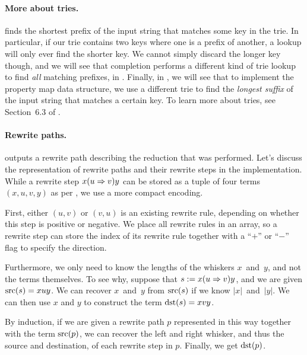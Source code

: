 \documentclass[../generics]{subfiles}
\begin{document}
\paragraph{More about tries.}  finds the shortest prefix of the input string that matches some key in the trie. In particular, if our trie contains two keys where one is a prefix of another, a lookup will only ever find the shorter key. We cannot simply discard the longer key though, and we will see that completion performs a different kind of trie lookup to find \emph{all} matching prefixes, in . Finally, in , we will see that to implement the property map data structure, we use a different trie to find the \emph{longest suffix} of the input string that matches a certain key. To learn more about tries, see Section~6.3 of \cite{art3}.

\paragraph{Rewrite paths.}
 outputs a rewrite path describing the reduction that was performed. Let's discuss the representation of rewrite paths and their rewrite steps in the implementation. While a rewrite step $x(u\Rightarrow v)y$ can be stored as a tuple of four terms $(x,u,v,y)$ as per , we use a more compact encoding.

First, either $(u,v)$ or $(v,u)$ is an existing rewrite rule, depending on whether this step is positive or negative. We place all rewrite rules in an array, so a rewrite step can store the index of its rewrite rule together with a ``$+$'' or ``$-$'' flag to specify the direction.

Furthermore, we only need to know the lengths of the whiskers $x$~and~$y$, and not the terms themselves. To see why, suppose that $s:=x(u\Rightarrow v)y$, and we are given $\operatorname{src}(s)=xuy$. We can recover $x$~and~$y$ from $\operatorname{src}(s)$ if we know $|x|$~and~$|y|$. We can then use $x$ and $y$ to construct the term $\operatorname{dst}(s)=xvy$.

By induction, if we are given a rewrite path $p$ represented in this way together with the term $\operatorname{src}(p)$, we can recover the left and right whisker, and thus the source and destination, of each rewrite step in $p$. Finally, we get $\operatorname{dst}(p)$.
\end{document}
